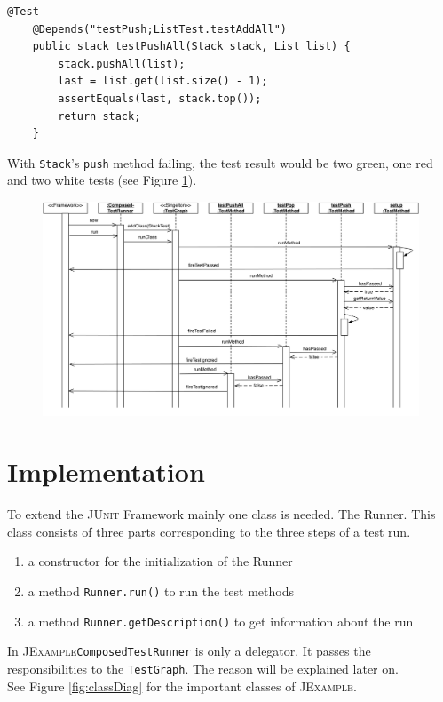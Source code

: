\documentclass[11pt]{article}
\newcommand{\JUnit}{\textsc{JUnit}\xspace}
\newcommand{\JExample}{\textsc{JExample}\xspace}
\newcommand{\ttt}[1]{\texttt{#1}}
\begin{document}
\begin{lstlisting}[label=lst:testpushall,caption=A test may have multiple dependencies.]
    @Test
    @Depends("testPush;ListTest.testAddAll")
    public stack testPushAll(Stack stack, List list) {
        stack.pushAll(list);
        last = list.get(list.size() - 1);
        assertEquals(last, stack.top());
        return stack;
    }
\end{lstlisting}

With \ttt{Stack}'s \ttt{push} method failing, the test result would be two green, one red and two white tests (see Figure \ref{fig:testPush}).

\begin{figure}[htbp]
 \includegraphics[width=15.0cm]{testPush.pdf}
 \caption{}
 \label{fig:testPush}
\end{figure}

\section{Implementation}

To extend the \JUnit Framework mainly one class is needed. The Runner. This class consists of three parts corresponding to the three steps of a test run.

\begin{enumerate}
 \item a constructor for the initialization of the Runner
 \item a method \verb|Runner.run()| to run the test methods
 \item a method \verb|Runner.getDescription()| to get information about the run
\end{enumerate}
In \JExample \verb|ComposedTestRunner| is only a delegator. It passes the responsibilities to the \verb|TestGraph|. The reason will be explained later on.\\
See Figure \ref{fig:classDiag} for the important classes of \JExample.
\end{document}
